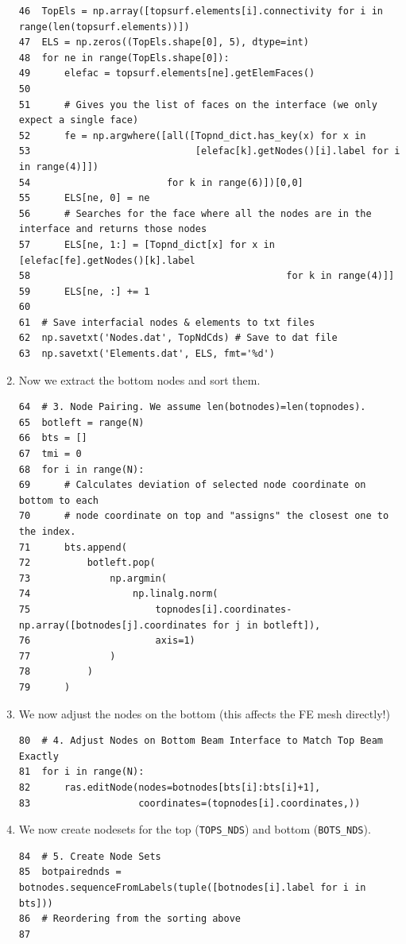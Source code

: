 \documentclass[11pt]{article}
\begin{document}
\begin{enumerate}
\begin{verbatim}
46  TopEls = np.array([topsurf.elements[i].connectivity for i in range(len(topsurf.elements))])
47  ELS = np.zeros((TopEls.shape[0], 5), dtype=int)
48  for ne in range(TopEls.shape[0]):
49      elefac = topsurf.elements[ne].getElemFaces()
50  
51      # Gives you the list of faces on the interface (we only expect a single face)
52      fe = np.argwhere([all([Topnd_dict.has_key(x) for x in 
53                             [elefac[k].getNodes()[i].label for i in range(4)]])
54                        for k in range(6)])[0,0]
55      ELS[ne, 0] = ne
56      # Searches for the face where all the nodes are in the interface and returns those nodes
57      ELS[ne, 1:] = [Topnd_dict[x] for x in [elefac[fe].getNodes()[k].label
58                                             for k in range(4)]]
59      ELS[ne, :] += 1
60  
61  # Save interfacial nodes & elements to txt files
62  np.savetxt('Nodes.dat', TopNdCds) # Save to dat file
63  np.savetxt('Elements.dat', ELS, fmt='%d')
\end{verbatim}
\item Now we extract the bottom nodes and sort them.
\begin{verbatim}
64  # 3. Node Pairing. We assume len(botnodes)=len(topnodes).
65  botleft = range(N)
66  bts = []
67  tmi = 0
68  for i in range(N):
69      # Calculates deviation of selected node coordinate on bottom to each
70      # node coordinate on top and "assigns" the closest one to the index.
71      bts.append(
72          botleft.pop(
73              np.argmin(
74                  np.linalg.norm(
75                      topnodes[i].coordinates-np.array([botnodes[j].coordinates for j in botleft]),
76                      axis=1)
77              )
78          )
79      )
\end{verbatim}
\item We now adjust the nodes on the bottom (this affects the FE mesh directly!)
\begin{verbatim}
80  # 4. Adjust Nodes on Bottom Beam Interface to Match Top Beam Exactly
81  for i in range(N):
82      ras.editNode(nodes=botnodes[bts[i]:bts[i]+1],
83                   coordinates=(topnodes[i].coordinates,))
\end{verbatim}
\item We now create nodesets for the top (\texttt{TOPS\_NDS}) and bottom (\texttt{BOTS\_NDS}).
\begin{verbatim}
84  # 5. Create Node Sets
85  botpairednds = botnodes.sequenceFromLabels(tuple([botnodes[i].label for i in bts]))
86  # Reordering from the sorting above
87  

\end{verbatim}
\end{enumerate}
\end{document}
